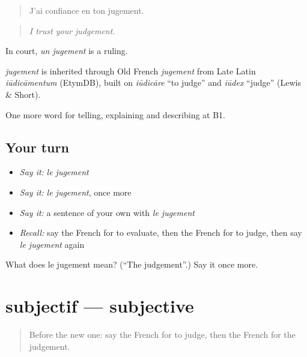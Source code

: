 \begin{quote}
J'ai confiance en ton jugement.
\end{quote}

\begin{quote}
\emph{I trust your judgement.}
\end{quote}

In court, \emph{un jugement} is a ruling.

\begin{cousinweb}
\emph{jugement} is inherited through Old French \emph{jugement} from Late Latin \emph{iūdicāmentum} (EtymDB), built on \emph{iūdicāre} \textquotedblleft{}to judge\textquotedblright{} and \emph{iūdex} \textquotedblleft{}judge\textquotedblright{} (Lewis \& Short).
\end{cousinweb}

\begin{grammarlens}[title={What you've built}]
One more word for telling, explaining and describing at B1.
\end{grammarlens}

\subsection*{Your turn}
\begin{itemize}
\raggedright
  \item \emph{Say it:} \emph{le jugement}
  \item \emph{Say it:} \emph{le jugement}, once more
  \item \emph{Say it:} a sentence of your own with \emph{le jugement}
  \item \emph{Recall:} say the French for to evaluate, then the French for to judge, then say \emph{le jugement} again
\end{itemize}

\begin{tcolorbox}[breakable,colback=teal!4,colframe=teal!35!black,title={Before you move on}]
What does le jugement mean? (\textquotedblleft{}The judgement\textquotedblright{}.) Say it once more.
\end{tcolorbox}
\section[subjectif]{subjectif — subjective}

\label{lesson:FR-C342-subjectif}



\begin{quote}
Before the new one: say the French for to judge, then the French for the judgement.
\end{quote}

